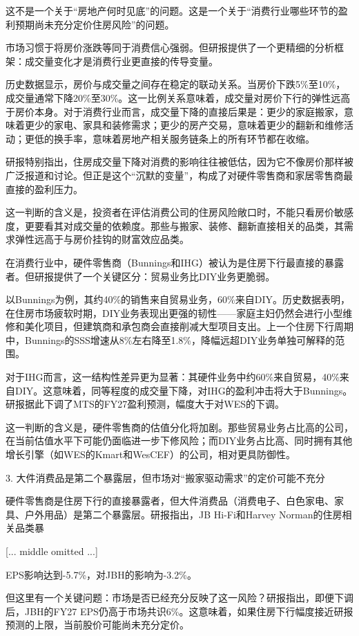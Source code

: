 \documentclass[11pt]{ctexart}
\begin{document}
这不是一个关于“房地产何时见底”的问题。这是一个关于“消费行业哪些环节的盈利预期尚未充分定价住房风险”的问题。

市场习惯于将房价涨跌等同于消费信心强弱。但研报提供了一个更精细的分析框架：成交量变化才是消费行业更直接的传导变量。

历史数据显示，房价与成交量之间存在稳定的联动关系。当房价下跌5\%至10\%，成交量通常下降20\%至30\%。这一比例关系意味着，成交量对房价下行的弹性远高于房价本身。对于消费行业而言，成交量下降的直接后果是：更少的家庭搬家，意味着更少的家电、家具和装修需求；更少的房产交易，意味着更少的翻新和维修活动；更低的换手率，意味着房地产相关服务链条上的所有环节都在收缩。

研报特别指出，住房成交量下降对消费的影响往往被低估，因为它不像房价那样被广泛报道和讨论。但正是这个“沉默的变量”，构成了对硬件零售商和家居零售商最直接的盈利压力。

这一判断的含义是，投资者在评估消费公司的住房风险敞口时，不能只看房价敏感度，更要看其对成交量的依赖度。那些与搬家、装修、翻新直接相关的品类，其需求弹性远高于与房价挂钩的财富效应品类。

在消费行业中，硬件零售商（Bunnings和IHG）被认为是住房下行最直接的暴露者。但研报提供了一个关键区分：贸易业务比DIY业务更脆弱。

以Bunnings为例，其约40\%的销售来自贸易业务，60\%来自DIY。历史数据表明，在住房市场疲软时期，DIY业务表现出更强的韧性——家庭主妇仍然会进行小型维修和美化项目，但建筑商和承包商会直接削减大型项目支出。上一个住房下行周期中，Bunnings的SSS增速从8\%左右降至1.8\%，降幅远超DIY业务单独可解释的范围。

对于IHG而言，这一结构性差异更为显著：其硬件业务中约60\%来自贸易，40\%来自DIY。这意味着，同等程度的成交量下降，对IHG的盈利冲击将大于Bunnings。研报据此下调了MTS的FY27盈利预测，幅度大于对WES的下调。

这一判断的含义是，硬件零售商的估值分化将加剧。那些贸易业务占比高的公司，在当前估值水平下可能仍面临进一步下修风险；而DIY业务占比高、同时拥有其他增长引擎（如WES的Kmart和WesCEF）的公司，相对更具防御性。

3. 大件消费品是第二个暴露层，但市场对“搬家驱动需求”的定价可能不充分

硬件零售商是住房下行的直接暴露者，但大件消费品（消费电子、白色家电、家具、户外用品）是第二个暴露层。研报指出，JB Hi-Fi和Harvey Norman的住房相关品类暴

[... middle omitted ...]

 EPS影响达到-5.7\%，对JBH的影响为-3.2\%。

但这里有一个关键问题：市场是否已经充分反映了这一风险？研报指出，即便下调后，JBH的FY27 EPS仍高于市场共识6\%。这意味着，如果住房下行幅度接近研报预测的上限，当前股价可能尚未充分定价。
\end{document}
